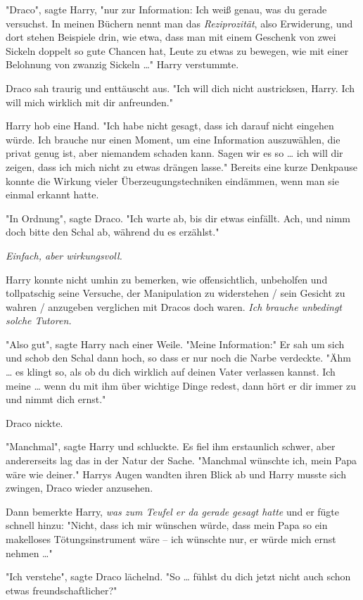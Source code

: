 {"Draco", sagte Harry, "nur zur Information: Ich weiß genau, was du gerade versuchst. In meinen Büchern nennt man das \emph{Reziprozität}, also Erwiderung, und dort stehen Beispiele drin, wie etwa, dass man mit einem Geschenk von zwei Sickeln doppelt so gute Chancen hat, Leute zu etwas zu bewegen, wie mit einer Belohnung von zwanzig Sickeln …" Harry verstummte.

Draco sah traurig und enttäuscht aus. "Ich will dich nicht austricksen, Harry. Ich will mich wirklich mit dir anfreunden."

Harry hob eine Hand. "Ich habe nicht gesagt, dass ich darauf nicht eingehen würde. Ich brauche nur einen Moment, um eine Information auszuwählen, die privat genug ist, aber niemandem schaden kann. Sagen wir es so … ich will dir zeigen, dass ich mich nicht zu etwas drängen lasse." Bereits eine kurze Denkpause konnte die Wirkung vieler Überzeugungstechniken eindämmen, wenn man sie einmal erkannt hatte.

"In Ordnung", sagte Draco. "Ich warte ab, bis dir etwas einfällt. Ach, und nimm doch bitte den Schal ab, während du es erzählst."

\emph{Einfach, aber wirkungsvoll.}

Harry konnte nicht umhin zu bemerken, wie offensichtlich, unbeholfen und tollpatschig seine Versuche, der Manipulation zu widerstehen / sein Gesicht zu wahren / anzugeben verglichen mit Dracos doch waren. \emph{Ich brauche unbedingt solche Tutoren.}

"Also gut", sagte Harry nach einer Weile. "Meine Information:" Er sah um sich und schob den Schal dann hoch, so dass er nur noch die Narbe verdeckte. "Ähm … es klingt so, als ob du dich wirklich auf deinen Vater verlassen kannst. Ich meine … wenn du mit ihm über wichtige Dinge redest, dann hört er dir immer zu und nimmt dich ernst."

Draco nickte.

"Manchmal", sagte Harry und schluckte. Es fiel ihm erstaunlich schwer, aber andererseits lag das in der Natur der Sache. "Manchmal wünschte ich, mein Papa wäre wie deiner." Harrys Augen wandten ihren Blick ab und Harry musste sich zwingen, Draco wieder anzusehen.

Dann bemerkte Harry, \emph{was zum Teufel er da gerade gesagt hatte} und er fügte schnell hinzu: "Nicht, dass ich mir wünschen würde, dass mein Papa so ein makelloses Tötungsinstrument wäre -- ich wünschte nur, er würde mich ernst nehmen …"

"Ich verstehe", sagte Draco lächelnd. "So … fühlst du dich jetzt nicht auch schon etwas freundschaftlicher?"

}
